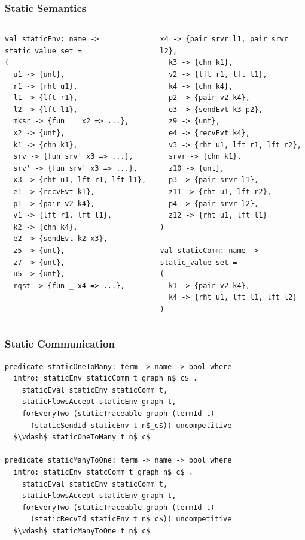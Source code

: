 \documentclass{beamer}
\begin{document}
\begin{frame}[fragile]
	\frametitle{Static Semantics}
\begin{columns}
\begin{column}{0.5\textwidth}
\begin{lstlisting}[language=sugar_lang, mathescape]
val staticEnv: name -> static_value set =
(
  u1 -> {unt},
  r1 -> {rht u1},
  l1 -> {lft r1},
  l2 -> {lft l1},
  mksr -> {fun  _ x2 => ...},
  x2 -> {unt},
  k1 -> {chn k1},
  srv -> {fun srv' x3 => ...},
  srv' -> {fun srv' x3 => ...},
  x3 -> {rht u1, lft r1, lft l1},
  e1 -> {recvEvt k1},
  p1 -> {pair v2 k4},
  v1 -> {lft r1, lft l1},
  k2 -> {chn k4},
  e2 -> {sendEvt k2 x3},
  z5 -> {unt},
  z7 -> {unt},
  u5 -> {unt},
  rqst -> {fun _ x4 => ...},
\end{lstlisting}
\end{column}

\begin{column}{0.5\textwidth}
\begin{lstlisting}[language=sugar_lang, mathescape]
  x4 -> {pair srvr l1, pair srvr l2},
  k3 -> {chn k1},
  v2 -> {lft r1, lft l1},
  k4 -> {chn k4},
  p2 -> {pair v2 k4},
  e3 -> {sendEvt k3 p2},
  z9 -> {unt},
  e4 -> {recvEvt k4},
  v3 -> {rht u1, lft r1, lft r2},
  srvr -> {chn k1},
  z10 -> {unt},
  p3 -> {pair srvr l1},
  z11 -> {rht u1, lft r2},
  p4 -> {pair srvr l2},
  z12 -> {rht u1, lft l1}
)

val staticComm: name -> static_value set =
(
  k1 -> {pair v2 k4},
  k4 -> {rht u1, lft l1, lft l2}
)
\end{lstlisting}
\end{column}
\end{columns}
\end{frame}

\begin{frame}[fragile]
	\frametitle{Static Communication}
\begin{lstlisting}[language=logic, mathescape]
predicate staticOneToMany: term -> name -> bool where
  intro: staticEnv staticComm t graph n$_c$ .
    staticEval staticEnv staticComm t,
    staticFlowsAccept staticEnv graph t,
    forEveryTwo (staticTraceable graph (termId t)
      (staticSendId staticEnv t n$_c$)) uncompetitive
  $\vdash$ staticOneToMany t n$_c$

predicate staticManyToOne: term -> name -> bool where
  intro: staticEnv statcComm t graph n$_c$ .
    staticEval staticEnv staticComm t,
    staticFlowsAccept staticEnv graph t,
    forEveryTwo (staticTraceable graph (termId t)
      (staticRecvId staticEnv t n$_c$)) uncompetitive
  $\vdash$ staticManyToOne t n$_c$
\end{lstlisting}
\end{frame}
\end{document}
